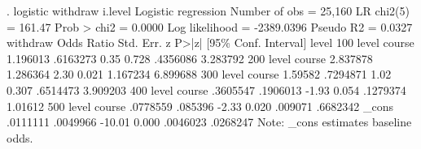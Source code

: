 . logistic withdraw i.level
{\smallskip}
Logistic regression                             Number of obs     =     25,160
                                                LR chi2(5)        =     161.47
                                                Prob > chi2       =     0.0000
Log likelihood = -2389.0396                     Pseudo R2         =     0.0327
{\smallskip}
         withdraw {\VBAR} Odds Ratio   Std. Err.      z    P>|z|     [95\% Conf. Interval]
            level {\VBAR}
100 level course  {\VBAR}   1.196013   .6163273     0.35   0.728     .4356086    3.283792
200 level course  {\VBAR}   2.837878   1.286364     2.30   0.021     1.167234    6.899688
300 level course  {\VBAR}    1.59582   .7294871     1.02   0.307     .6514473    3.909203
400 level course  {\VBAR}   .3605547   .1906013    -1.93   0.054     .1279374     1.01612
500 level course  {\VBAR}   .0778559    .085396    -2.33   0.020      .009071    .6682342
                  {\VBAR}
            _cons {\VBAR}   .0111111   .0049966   -10.01   0.000     .0046023    .0268247
Note: _cons estimates baseline odds.
{\smallskip}
